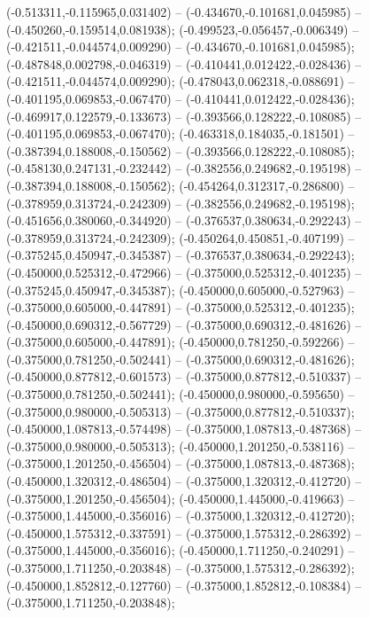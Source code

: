  (-0.513311,-0.115965,0.031402) -- (-0.434670,-0.101681,0.045985) -- (-0.450260,-0.159514,0.081938);
 (-0.499523,-0.056457,-0.006349) -- (-0.421511,-0.044574,0.009290) -- (-0.434670,-0.101681,0.045985);
 (-0.487848,0.002798,-0.046319) -- (-0.410441,0.012422,-0.028436) -- (-0.421511,-0.044574,0.009290);
 (-0.478043,0.062318,-0.088691) -- (-0.401195,0.069853,-0.067470) -- (-0.410441,0.012422,-0.028436);
 (-0.469917,0.122579,-0.133673) -- (-0.393566,0.128222,-0.108085) -- (-0.401195,0.069853,-0.067470);
 (-0.463318,0.184035,-0.181501) -- (-0.387394,0.188008,-0.150562) -- (-0.393566,0.128222,-0.108085);
 (-0.458130,0.247131,-0.232442) -- (-0.382556,0.249682,-0.195198) -- (-0.387394,0.188008,-0.150562);
 (-0.454264,0.312317,-0.286800) -- (-0.378959,0.313724,-0.242309) -- (-0.382556,0.249682,-0.195198);
 (-0.451656,0.380060,-0.344920) -- (-0.376537,0.380634,-0.292243) -- (-0.378959,0.313724,-0.242309);
 (-0.450264,0.450851,-0.407199) -- (-0.375245,0.450947,-0.345387) -- (-0.376537,0.380634,-0.292243);
 (-0.450000,0.525312,-0.472966) -- (-0.375000,0.525312,-0.401235) -- (-0.375245,0.450947,-0.345387);
 (-0.450000,0.605000,-0.527963) -- (-0.375000,0.605000,-0.447891) -- (-0.375000,0.525312,-0.401235);
 (-0.450000,0.690312,-0.567729) -- (-0.375000,0.690312,-0.481626) -- (-0.375000,0.605000,-0.447891);
 (-0.450000,0.781250,-0.592266) -- (-0.375000,0.781250,-0.502441) -- (-0.375000,0.690312,-0.481626);
 (-0.450000,0.877812,-0.601573) -- (-0.375000,0.877812,-0.510337) -- (-0.375000,0.781250,-0.502441);
 (-0.450000,0.980000,-0.595650) -- (-0.375000,0.980000,-0.505313) -- (-0.375000,0.877812,-0.510337);
 (-0.450000,1.087813,-0.574498) -- (-0.375000,1.087813,-0.487368) -- (-0.375000,0.980000,-0.505313);
 (-0.450000,1.201250,-0.538116) -- (-0.375000,1.201250,-0.456504) -- (-0.375000,1.087813,-0.487368);
 (-0.450000,1.320312,-0.486504) -- (-0.375000,1.320312,-0.412720) -- (-0.375000,1.201250,-0.456504);
 (-0.450000,1.445000,-0.419663) -- (-0.375000,1.445000,-0.356016) -- (-0.375000,1.320312,-0.412720);
 (-0.450000,1.575312,-0.337591) -- (-0.375000,1.575312,-0.286392) -- (-0.375000,1.445000,-0.356016);
 (-0.450000,1.711250,-0.240291) -- (-0.375000,1.711250,-0.203848) -- (-0.375000,1.575312,-0.286392);
 (-0.450000,1.852812,-0.127760) -- (-0.375000,1.852812,-0.108384) -- (-0.375000,1.711250,-0.203848);

